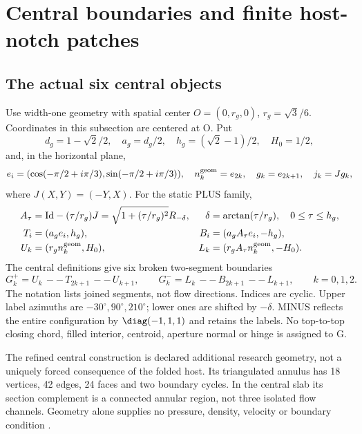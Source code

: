 \section{Central boundaries and finite host-notch patches}\label{sec:geometry}
\subsection{The actual six central objects}
Use width-one geometry with spatial center $O=(0,r_g,0)$, $r_g=\sqrt3/6$. Coordinates in this subsection are centered at O. Put
\begin{equation}\label{eq:constants}
 d_g=1-\sqrt2/2,\quad a_g=d_g/2,\quad h_g=(\sqrt2-1)/2,\quad H_0=1/2,
\end{equation}
and, in the horizontal plane,
\begin{equation}\label{eq:directions}
 e_i=(\cos(-\pi/2+i\pi/3),\sin(-\pi/2+i\pi/3)),\quad
 n_k^{\rm geom}=e_{2k},\quad g_k=e_{2k+1},\quad j_k=Jg_k,
\end{equation}
where $J(X,Y)=(-Y,X)$. For the static PLUS family,
\begin{align}
 A_\tau&=\mathrm{Id}-(\tau/r_g)J
       =\sqrt{1+(\tau/r_g)^2}R_{-\delta},
 &\delta&=\arctan(\tau/r_g),\quad0\le\tau\le h_g,\notag\\
 T_i&=(a_ge_i,h_g),&B_i&=(a_gA_\tau e_i,-h_g),\notag\\
 U_k&=(r_gn_k^{\rm geom},H_0),&L_k&=(r_gA_\tau n_k^{\rm geom},-H_0).\label{eq:vertices}
\end{align}
The central definitions \cite{central,fixedgap} give six broken two-segment boundaries
\begin{equation}\label{eq:G}
 G_k^+=U_k\,--\,T_{2k+1}\,--\,U_{k+1},\qquad
 G_k^-=L_k\,--\,B_{2k+1}\,--\,L_{k+1},\qquad k=0,1,2.
\end{equation}
The notation lists joined segments, not flow directions. Indices are cyclic. Upper label azimuths are $-30^\circ,90^\circ,210^\circ$; lower ones are shifted by $-\delta$. MINUS reflects the entire configuration by $\diag(-1,1,1)$ and retains the labels. No top-to-top closing chord, filled interior, centroid, aperture normal or hinge is assigned to G.

The refined central construction is declared additional research geometry, not a uniquely forced consequence of the folded host. Its triangulated annulus has 18 vertices, 42 edges, 24 faces and two boundary cycles. In the central slab its section complement is a connected annular region, not three isolated flow channels. Geometry alone supplies no pressure, density, velocity or boundary condition \cite{central}.

